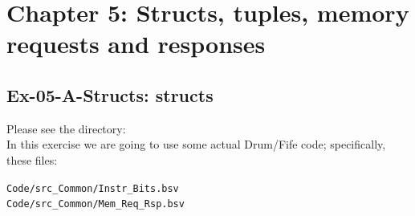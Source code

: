 
\hdivider

\section*{Chapter 5: Structs, tuples, memory requests and responses}


\subsection*{Ex-05-A-Structs: structs}
\label{Ex-05-A-Structs}

Please see the directory:  \\
In this exercise we are going to use some actual Drum/Fife code;
specifically, these files:

\begin{tabbing}
\hmmmm \= \verb|Code/src_Common/Instr_Bits.bsv| \\
       \> \verb|Code/src_Common/Mem_Req_Rsp.bsv|
\end{tabbing}

